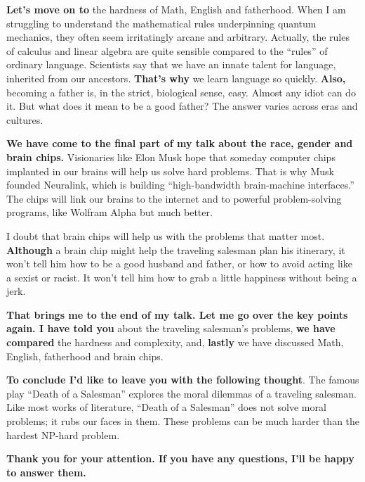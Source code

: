 \documentclass[a4paper]{article}
\renewcommand{\emph}{\textbf}
\begin{document}
\emph{Let's move on to} the hardness of Math, English and fatherhood. When I am struggling to understand the mathematical rules underpinning quantum mechanics, they often seem irritatingly arcane and arbitrary. Actually, the rules of calculus and linear algebra are quite sensible compared to the “rules” of ordinary language.
Scientists say that we have an innate talent for language, inherited from our ancestors. \emph{That’s why} we learn language so quickly.
\emph{Also,} becoming a father is, in the strict, biological sense, easy. Almost any idiot can do it. But what does it mean to be a good father? The answer varies across eras and cultures.

\emph{We have come to the final part of my talk about the race, gender and brain chips.}
Visionaries like Elon Musk hope that someday computer chips implanted in our brains will help us solve hard problems. That is why Musk founded Neuralink, which is building “high-bandwidth brain-machine interfaces.” The chips will link our brains to the internet and to powerful problem-solving programs, like Wolfram Alpha but much better.

I doubt that brain chips will help us with the problems that matter most. \emph{Although} a brain chip might help the traveling salesman plan his itinerary, it won’t tell him how to be a good husband and father, or how to avoid acting like a sexist or racist. It won’t tell him how to grab a little happiness without being a jerk. 

\emph{That brings me to the end of my talk. Let me go over the key points again. I have told you} about the traveling
salesman's problems, \emph{we have compared} the
hardness and complexity, and,\emph{ lastly} we have
discussed Math, English, fatherhood and brain chips.

\emph{To conclude I’d like to leave you with the following thought}.
The famous play ``Death of a Salesman'' explores the moral dilemmas of a traveling salesman. Like most works of literature, ``Death of a Salesman'' does not solve moral problems; it rubs our faces in them. These problems can be much harder than the hardest NP-hard problem.

\emph{Thank you for your attention. If you have any questions, I’ll be happy to answer them. }
\end{document}
